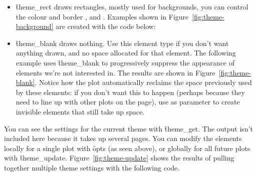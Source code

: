 \begin{itemize}
  \item \f{theme_rect} draws rectangles, mostly used for backgrounds, you can control the  colour and border ,  and .  Examples shown in Figure~\ref{fig:theme-background} are created with the code below:
  
    

  \item \f{theme_blank} draws nothing.  Use this element type if you don't want anything drawn, and no space allocated for that element.  The following example uses \f{theme_blank} to progressively suppress the appearance of elements we're not interested in. The results are shown in Figure~\ref{fig:theme-blank}.  Notice how the plot automatically reclaims the space previously used by these elements: if you don't want this to happen (perhaps because they need to line up with other plots on the page), use  as parameter to create invisible elements that still take up space.

    

\end{itemize}

You can see the settings for the current theme with \f{theme_get}.  The output isn't included here because it takes up several pages.  You can modify the elements locally for a single plot with \f{opts} (as seen above), or globally for all future plots with \f{theme_update}.  Figure~\ref{fig:theme-update} shows the results of pulling together multiple theme settings with the following code.

